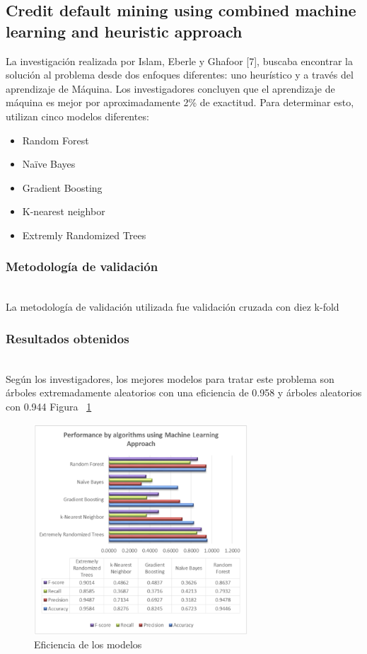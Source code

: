 \documentclass[conference]{IEEEtran}
\begin{document}
\subsection{Credit default mining using combined machine learning and heuristic approach}

La investigación realizada por Islam, Eberle y Ghafoor [7], buscaba encontrar la solución al problema desde dos enfoques diferentes: uno heurístico y a través del aprendizaje de Máquina. Los investigadores concluyen que el aprendizaje de máquina es mejor por aproximadamente 2\% de exactitud. Para determinar esto, utilizan cinco modelos diferentes: 
\begin{itemize}
\item Random Forest
\item Naïve Bayes
\item Gradient Boosting
\item K-nearest neighbor
\item Extremly Randomized Trees
\end{itemize}
\hfill
\subsubsection{Metodología de validación}\hfill\\
La metodología de validación utilizada fue validación cruzada con diez k-fold
\hfill\\
\subsubsection{Resultados obtenidos}\hfill\\
Según los investigadores, los mejores modelos para tratar este problema son árboles extremadamente aleatorios con una eficiencia de 0.958 y árboles aleatorios con 0.944 Figura ~\ref{fig:Accuracy_3}\\ 

\begin{center}
    \begin{figure}[H]
        \hfill
            \includegraphics[width=8cm]{Accuracy_3.png}\hspace*{\fill}
    \caption{Eficiencia de los modelos}
    \label{fig:Accuracy_3}
    \end{figure}  
\end{center}
\end{document}
